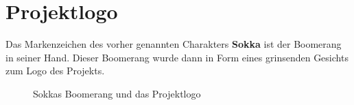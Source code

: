 \newpage

\section{Projektlogo}

Das Markenzeichen des vorher genannten Charakters \textbf{Sokka} ist der Boomerang in seiner Hand. Dieser Boomerang wurde dann in Form eines grinsenden Gesichts zum Logo des Projekts.

\begin{figure}[H]
    \centering
    \hfill
    \hfill
    \hfill
    \caption{Sokkas Boomerang und das Projektlogo}
\end{figure}